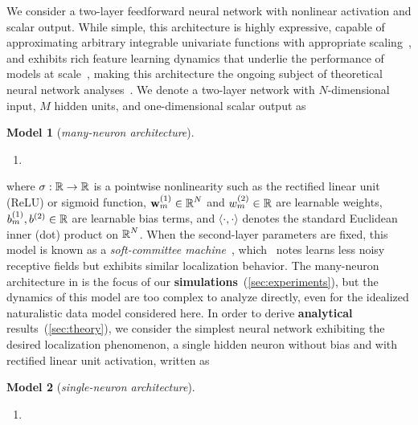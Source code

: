 We consider a two-layer feedforward neural network with nonlinear activation and scalar output.
While simple, this architecture is highly expressive, capable of approximating arbitrary 
integrable univariate functions with appropriate scaling~\parencite{barron1993universal, pinkus1999approximation},
and exhibits rich feature learning dynamics that underlie the performance of models at scale~\parencite{woodworth2020kernel},
making this architecture the ongoing subject of theoretical neural network analyses~\parencite{mei2018mean, goldt2019dynamics, veiga2022phase}.
We denote a two-layer network with $N$-dimensional input, $M$ hidden units, and one-dimensional scalar output as
\begin{model}{\textbf{Model 1} (\emph{many-neuron architecture}).}{}
\begin{enumerate}[series=modelenumi]
  \item \label{item:many-neuron-model} 
\end{enumerate}
\end{model}
where $\sigma : \operatorname{\mathbb{R}} \to \operatorname{\mathbb{R}}$ is a pointwise nonlinearity such as the rectified linear unit (ReLU) or sigmoid function,
$\mathbf{w}_m^{(1)} \in \operatorname{\mathbb{R}}^N$ and $w_m^{(2)} \in \operatorname{\mathbb{R}}$ are learnable weights, 
$b_m^{(1)}, b^{(2)} \in \operatorname{\mathbb{R}}$ are learnable bias terms, and
$\langle \cdot, \cdot \rangle$ denotes the standard Euclidean inner (dot) product on $\operatorname{\mathbb{R}}^N$.
When the second-layer parameters are fixed, this model is known as a \emph{soft-committee machine}~\parencite[SCM;][]{saad1995line},
which~\parencite{ingrosso2022data} notes learns less noisy receptive fields but exhibits similar localization behavior.
The many-neuron architecture in  is the focus of our \textbf{simulations}~(\cref{sec:experiments}), but the dynamics of this model 
are too complex to analyze directly, even for the idealized naturalistic data model considered here.
In order to derive \textbf{analytical} results~(\cref{sec:theory}), we consider the simplest neural network exhibiting the desired localization phenomenon, a single hidden neuron without bias and with rectified linear unit activation, written as
\begin{model}{\textbf{Model 2} (\emph{single-neuron architecture}).}{}
\begin{enumerate}[resume*=modelenumi]
  \item \label{item:single-neuron-model} 
\end{enumerate}
\end{model}
